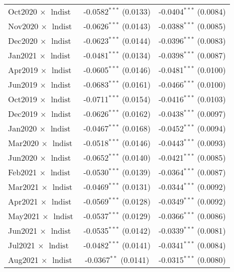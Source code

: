 \begin{table}
\begin{threeparttable}[b]
\begin{tabular}{lcc}
         Oct2020 $\times$ $\ln \text{dist}$    & -0.0582$^{***}$ (0.0133) & -0.0404$^{***}$ (0.0084)\\   
         Nov2020 $\times$ $\ln \text{dist}$    & -0.0626$^{***}$ (0.0143) & -0.0388$^{***}$ (0.0085)\\   
         Dec2020 $\times$ $\ln \text{dist}$    & -0.0623$^{***}$ (0.0144) & -0.0396$^{***}$ (0.0083)\\   
         Jan2021 $\times$ $\ln \text{dist}$    & -0.0481$^{***}$ (0.0134) & -0.0398$^{***}$ (0.0087)\\   
         Apr2019 $\times$ $\ln \text{dist}$    & -0.0605$^{***}$ (0.0146) & -0.0481$^{***}$ (0.0100)\\   
         Jun2019 $\times$ $\ln \text{dist}$    & -0.0683$^{***}$ (0.0161) & -0.0466$^{***}$ (0.0100)\\   
         Oct2019 $\times$ $\ln \text{dist}$    & -0.0711$^{***}$ (0.0154) & -0.0416$^{***}$ (0.0103)\\   
         Dec2019 $\times$ $\ln \text{dist}$    & -0.0626$^{***}$ (0.0162) & -0.0438$^{***}$ (0.0097)\\   
         Jan2020 $\times$ $\ln \text{dist}$    & -0.0467$^{***}$ (0.0168) & -0.0452$^{***}$ (0.0094)\\   
         Mar2020 $\times$ $\ln \text{dist}$    & -0.0518$^{***}$ (0.0146) & -0.0443$^{***}$ (0.0093)\\   
         Jun2020 $\times$ $\ln \text{dist}$    & -0.0652$^{***}$ (0.0140) & -0.0421$^{***}$ (0.0085)\\   
         Feb2021 $\times$ $\ln \text{dist}$    & -0.0530$^{***}$ (0.0139) & -0.0364$^{***}$ (0.0087)\\   
         Mar2021 $\times$ $\ln \text{dist}$    & -0.0469$^{***}$ (0.0131) & -0.0344$^{***}$ (0.0092)\\   
         Apr2021 $\times$ $\ln \text{dist}$    & -0.0569$^{***}$ (0.0128) & -0.0349$^{***}$ (0.0092)\\   
         May2021 $\times$ $\ln \text{dist}$    & -0.0537$^{***}$ (0.0129) & -0.0366$^{***}$ (0.0086)\\   
         Jun2021 $\times$ $\ln \text{dist}$    & -0.0535$^{***}$ (0.0142) & -0.0339$^{***}$ (0.0081)\\   
         Jul2021 $\times$ $\ln \text{dist}$    & -0.0482$^{***}$ (0.0141) & -0.0341$^{***}$ (0.0084)\\   
         Aug2021 $\times$ $\ln \text{dist}$    & -0.0367$^{**}$ (0.0141)  & -0.0315$^{***}$ (0.0080)\\   

\end{tabular}
\end{threeparttable}
\end{table}
